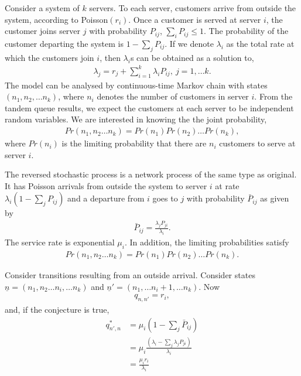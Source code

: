 \documentclass[a4paper,10pt,english]{article}
\begin{document}
Consider a system of $k$ servers. To each server, customers arrive from outside the system, according to Poisson$(r_i)$. Once a customer is served at server $i$, the customer joins server $j$ with probability $P_{ij}$, $\sum_{i}P_{ij} \leq 1$. The probability of the customer departing the system is $1-\sum_{j}P_{ij}$. If we denote $\lambda_i$ as the total rate at which the customers join $i$, then $\lambda_i$s can be obtained as a solution to,
\begin{align*}
\lambda_j=r_j+\sum_{i=1}^{k}\lambda_i P_{ij},~ j=1, \hdots k.
\end{align*}
The model can be analysed by continuous-time Markov chain with states $(n_1,n_2, \hdots n_k)$, where $n_i$ denotes the number of customers in server $i$. From the tandem queue results, we expect the customers at each server to be independent random variables. We are interested in knowing the the joint probability,
\begin{align*}
Pr(n_1,n_2 \hdots n_k)=Pr(n_1)Pr(n_2) \hdots Pr(n_k),
\end{align*}
where $Pr(n_i)$ is the limiting probability that there are $n_i$ customers to serve at server $i$.
\begin{conj}
The reversed stochastic process is a network process of the same type as original. It has Poisson arrivals from outside the system to server $i$ at rate $\lambda_i(1-\sum_jP_{ij})$ and a departure from $i$ goes to $j$ with probability $\bar{P}_{ij}$ as given by
\begin{align*}
\bar{P}_{ij}=\frac{\lambda_j P_{ji}}{\lambda_i}.
\end{align*}
The service rate is exponential $\mu_i$. In addition, the limiting probabilities satisfy
\begin{align*}
Pr(n_1,n_2 \hdots n_k)=Pr(n_1)Pr(n_2)\hdots Pr(n_k).
\end{align*}
\end{conj}
 Consider transitions resulting from an outside arrival. Consider states $\underline{n}=(n_1,n_2 \hdots n_i, \hdots n_k)$ and $\underline{n}'=(n_1,\hdots n_i+1,\hdots n_k)$. Now
 \begin{align*}
 q_{n,n'}=r_i,
 \end{align*}
 and, if the conjecture is true,
 \begin{align*}
 q_{n',n}^*&=\mu_i(1-\sum_{j}\bar{P}_{ij})\\
 &=\mu_i \frac{(\lambda_i-\sum_{j}\lambda_j {P}_{ji})}{\lambda_i}\\
 &=\frac{\mu_i r_i}{\lambda_i}
 \end{align*}
\end{document}
